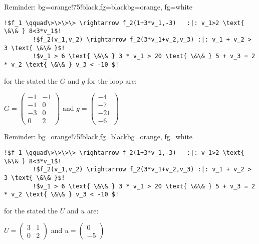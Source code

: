 \begin{frame}[fragile]
	\begin{variableblock}{Reminder: \its}{bg=orange!75!black,fg=black}{bg=orange, fg=white}
		\begin{lstlisting}[linewidth=10.5cm, escapechar = !]
		!$f_1 \qquad\>\>\>\> \rightarrow f_2(1+3*v_1,-3)   :|: v_1>2 \text{ \&\& } 8<3*v_1$!
		!$f_2(v_1,v_2) \rightarrow f_2(3*v_1+v_2,v_3) :|: v_1 + v_2 > 3 \text{ \&\& }$! 
		!$v_1 > 6 \text{ \&\& } 3 * v_1 > 20 \text{ \&\& } 5 + v_3 = 2 * v_2 \text{ \&\& } v_3 < -10 $!
		\end{lstlisting}
	\end{variableblock}
	\begin{example}[\guardmatrix, \guardconstants]
		for the stated \its the \guardconstants $G$ and \guardconstants $g$ for the loop are:\newline
		\begin{center}
			\vspace{-2em}
			$G = \begin{pmatrix} -1 & -1 \\ -1 & 0 \\ -3 & 0 \\ 0 & 2 \end{pmatrix}$ and $g= \begin{pmatrix} -4 \\ -7 \\ -21 \\ -6 \end{pmatrix}$
		\end{center}		
	\end{example}
\end{frame}

\begin{frame}[fragile]
	\begin{variableblock}{Reminder: \its}{bg=orange!75!black,fg=black}{bg=orange, fg=white}
		\begin{lstlisting}[linewidth=10.5cm, escapechar = !]
		!$f_1 \qquad\>\>\>\> \rightarrow f_2(1+3*v_1,-3)   :|: v_1>2 \text{ \&\& } 8<3*v_1$!
		!$f_2(v_1,v_2) \rightarrow f_2(3*v_1+v_2,v_3) :|: v_1 + v_2 > 3 \text{ \&\& }$! 
		!$v_1 > 6 \text{ \&\& } 3 * v_1 > 20 \text{ \&\& } 5 + v_3 = 2 * v_2 \text{ \&\& } v_3 < -10 $!
		\end{lstlisting}
	\end{variableblock}
		\begin{example}[\updatematrix, \updateconstants]
			for the stated \its the \updatematrix $U$ and \updateconstants $u$ are:\newline
			\begin{center}
				\vspace{-2em}
				$U = \begin{pmatrix} 3 & 1 \\ 0 & 2 \end{pmatrix}$ and $u = \begin{pmatrix} 0 \\ -5 \end{pmatrix}$
			\end{center}		
		\end{example}
\end{frame}

